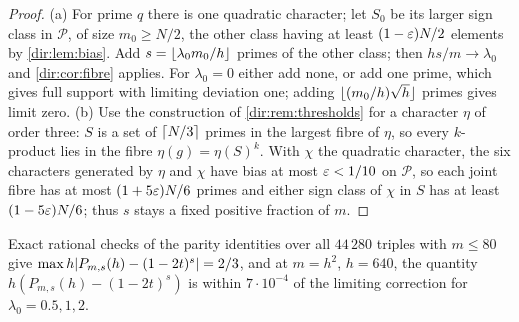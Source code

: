 \begin{proof}
(a) For prime $q$ there is one quadratic character; let $S_0$ be its larger sign class in $\mathcal P$,
of size $m_0\ge N/2$, the other class having at least $(1-\varepsilon)N/2$ elements by \cref{dir:lem:bias}. Add
$s=\lfloor\lambda_0m_0/h\rfloor$ primes of the other class; then $hs/m\to\lambda_0$ and \cref{dir:cor:fibre}
applies. For $\lambda_0=0$ either add none, or add one prime, which gives full support with limiting
deviation one; adding $\lfloor(m_0/h)\sqrt h\rfloor$ primes gives limit zero.
(b) Use the construction of \cref{dir:rem:thresholds} for a character $\eta$ of order three: $S$ is a set of
$\lceil N/3\rceil$ primes in the largest fibre of $\eta$, so every $k$-product lies in the fibre $\eta(g)=\eta(S)^k$. With
$\chi$ the quadratic character, the six characters generated by $\eta$ and $\chi$ have bias at most $\varepsilon<1/10$
on $\mathcal P$, so each joint fibre has at most $(1+5\varepsilon)N/6$ primes and either sign class of $\chi$ in $S$ has
at least $(1-5\varepsilon)N/6$; thus $s$ stays a fixed positive fraction of $m$.
\end{proof}

Exact rational checks of the parity identities over all $44\,280$ triples with $m\le80$ give
$\max h\lvert P_{m,s}(h)-(1-2t)^s\rvert=2/3$, and at $m=h^2$, $h=640$, the quantity $h(P_{m,s}(h)-(1-2t)^s)$ is
within $7\cdot10^{-4}$ of the limiting correction for $\lambda_0=0.5,1,2$.

